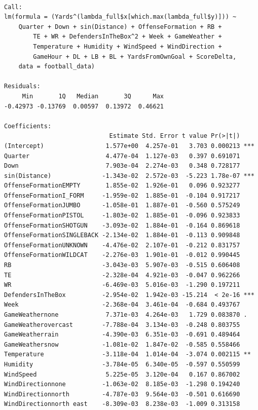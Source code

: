 \documentclass[
  super,
  preprint,
  3p]{elsarticle}
\begin{document}
\begin{verbatim}

Call:
lm(formula = (Yards^(lambda_full$x[which.max(lambda_full$y)])) ~ 
    Quarter + Down + sin(Distance) + OffenseFormation + RB + 
        TE + WR + DefendersInTheBox^2 + Week + GameWeather + 
        Temperature + Humidity + WindSpeed + WindDirection + 
        GameHour + DL + LB + BL + YardsFromOwnGoal + ScoreDelta, 
    data = football_data)

Residuals:
     Min       1Q   Median       3Q      Max 
-0.42973 -0.13769  0.00597  0.13972  0.46621 

Coefficients:
                             Estimate Std. Error t value Pr(>|t|)    
(Intercept)                 1.577e+00  4.257e-01   3.703 0.000213 ***
Quarter                     4.477e-04  1.127e-03   0.397 0.691071    
Down                        7.903e-04  2.274e-03   0.348 0.728177    
sin(Distance)              -1.343e-02  2.572e-03  -5.223 1.78e-07 ***
OffenseFormationEMPTY       1.855e-02  1.926e-01   0.096 0.923277    
OffenseFormationI_FORM     -1.959e-02  1.885e-01  -0.104 0.917217    
OffenseFormationJUMBO      -1.058e-01  1.887e-01  -0.560 0.575249    
OffenseFormationPISTOL     -1.803e-02  1.885e-01  -0.096 0.923833    
OffenseFormationSHOTGUN    -3.093e-02  1.884e-01  -0.164 0.869618    
OffenseFormationSINGLEBACK -2.134e-02  1.884e-01  -0.113 0.909848    
OffenseFormationUNKNOWN    -4.476e-02  2.107e-01  -0.212 0.831757    
OffenseFormationWILDCAT    -2.276e-03  1.901e-01  -0.012 0.990445    
RB                         -3.043e-03  5.907e-03  -0.515 0.606408    
TE                         -2.328e-04  4.921e-03  -0.047 0.962266    
WR                         -6.469e-03  5.016e-03  -1.290 0.197211    
DefendersInTheBox          -2.954e-02  1.942e-03 -15.214  < 2e-16 ***
Week                       -2.368e-04  3.461e-04  -0.684 0.493767    
GameWeathernone             7.371e-03  4.264e-03   1.729 0.083870 .  
GameWeatherovercast        -7.788e-04  3.134e-03  -0.248 0.803755    
GameWeatherrain            -4.390e-03  6.351e-03  -0.691 0.489464    
GameWeathersnow            -1.081e-02  1.847e-02  -0.585 0.558466    
Temperature                -3.118e-04  1.014e-04  -3.074 0.002115 ** 
Humidity                   -3.784e-05  6.340e-05  -0.597 0.550599    
WindSpeed                   5.225e-05  3.120e-04   0.167 0.867002    
WindDirectionnone          -1.063e-02  8.185e-03  -1.298 0.194240    
WindDirectionnorth         -4.787e-03  9.564e-03  -0.501 0.616690    
WindDirectionnorth east    -8.309e-03  8.238e-03  -1.009 0.313158    

\end{verbatim}
\end{document}
